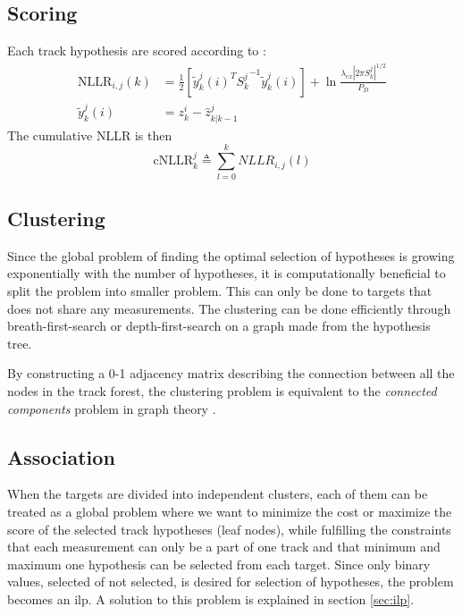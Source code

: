 \subsection{Scoring}
Each track hypothesis are scored according to \cite{Bar-Shalom2007}:
\begin{equation}
\begin{split}
\mathrm{NLLR}_{i,j}(k) &= \frac{1}{2} \left[ {\tilde{y}_k^j}(i)^T {S_k^j}^{-1} {\tilde{y}_k^j}(i) \right] + \ln \frac{\lambda_{ex} |2 \pi S_k^j|^{1/2}}{P_D} \\				
\tilde{y}_k^j(i) &= z_k^i -\hat{z}_{k|k-1}^j
\end{split}
\end{equation}
The cumulative NLLR is then
\begin{equation}
\mathrm{cNLLR}_k^j \triangleq \sum_{l=0}^k NLLR_{i,j}(l)
\end{equation}

\subsection{Clustering}
Since the global problem of finding the optimal selection of hypotheses is growing exponentially with the number of hypotheses, it is computationally beneficial to split the problem into smaller problem. This can only be done to targets that does not share any measurements. The clustering can be done efficiently through breath-first-search or depth-first-search on a graph made from the hypothesis tree.

By constructing a 0-1 adjacency matrix describing the connection between all the nodes in the track forest, the clustering problem is equivalent to the \emph{connected components} problem in graph theory \cite{Chen2015}.

\subsection{Association}
When the targets are divided into independent clusters, each of them can be treated as a global problem where we want to minimize the cost or maximize the score of the selected track hypotheses (leaf nodes), while fulfilling the constraints that each measurement can only be a part of one track and that minimum and maximum one hypothesis can be selected from each target. Since only binary values, selected of not selected, is desired for selection of hypotheses, the problem becomes an \gls{ilp}. A solution to this problem is explained in section \ref{sec:ilp}.

